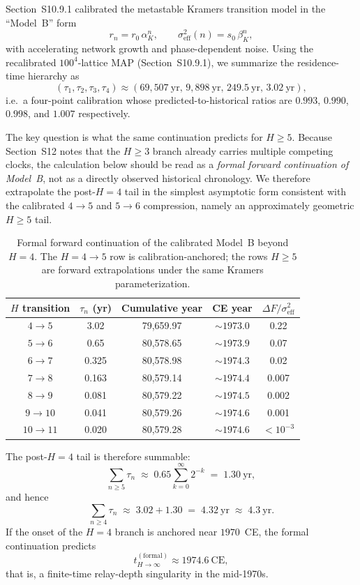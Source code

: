 \documentclass[11pt]{article}
\begin{document}
Section~S10.9.1 calibrated the metastable Kramers transition model in the
``Model~B'' form
\[
r_n = r_0\,\alpha_K^n,\qquad\sigma_{\mathrm{eff}}^2(n)=s_0\,\beta_K^n,
\]
with accelerating network growth and phase-dependent noise.
Using the recalibrated $100^4$-lattice MAP (Section~S10.9.1), we summarize the residence-time hierarchy as
\[
(\tau_1,\tau_2,\tau_3,\tau_4)\approx(69{,}507~\mathrm{yr},\,9{,}898~\mathrm{yr},\,249.5~\mathrm{yr},\,3.02~\mathrm{yr}),
\]
i.e.\ a four-point calibration whose predicted-to-historical ratios are
$0.993$, $0.990$, $0.998$, and $1.007$ respectively.

The key question is what the same continuation predicts for \(H\ge 5\).
Because Section~S12 notes that the \(H\ge 3\) branch already carries multiple
competing clocks, the calculation below should be read as a \emph{formal forward
continuation of Model~B}, not as a directly observed historical chronology.
We therefore extrapolate the post-\(H=4\) tail in the simplest asymptotic form
consistent with the calibrated \(4\to5\) and \(5\to6\) compression, namely an
approximately geometric \(H\ge 5\) tail.

\begin{table}[H]
\centering
\caption{Formal forward continuation of the calibrated Model~B beyond \(H=4\).
The \(H=4\to5\) row is calibration-anchored; the rows \(H\ge 5\) are
forward extrapolations under the same Kramers parameterization.}
\label{tab:S10_9_4_future}
\begin{tabular}{ccccc}
\toprule
\(H\) transition & \(\tau_n\) (yr) & Cumulative year & CE year & \(\Delta F/\sigma_{\mathrm{eff}}^2\) \\
\midrule
\(4\to5\) & 3.02 & 79,659.97 & \(\sim 1973.0\) & 0.22 \\
\(5\to6\) & 0.65 & 80,578.65 & \(\sim 1973.9\) & 0.07 \\
\(6\to7\) & 0.325 & 80,578.98 & \(\sim 1974.3\) & 0.02 \\
\(7\to8\) & 0.163 & 80,579.14 & \(\sim 1974.4\) & 0.007 \\
\(8\to9\) & 0.081 & 80,579.22 & \(\sim 1974.5\) & 0.002 \\
\(9\to10\) & 0.041 & 80,579.26 & \(\sim 1974.6\) & 0.001 \\
\(10\to11\) & 0.020 & 80,579.28 & \(\sim 1974.6\) & \(<10^{-3}\) \\
\bottomrule
\end{tabular}
\end{table}

The post-\(H=4\) tail is therefore summable:
\[
\sum_{n\ge 5}\tau_n\;\approx\;0.65\sum_{k=0}^{\infty}2^{-k}\;=\;1.30~\mathrm{yr},
\]
and hence
\[
\sum_{n\ge 4}\tau_n\;\approx\;3.02 + 1.30\;=\;4.32~\mathrm{yr}\;\approx\;4.3~\mathrm{yr}.
\]
If the onset of the \(H=4\) branch is anchored near \(1970\)~CE, the formal
continuation predicts
\[
t_{H\to\infty}^{\mathrm{(formal)}} \approx 1974.6~\mathrm{CE},
\]
that is, a finite-time relay-depth singularity in the mid-1970s.
\end{document}
